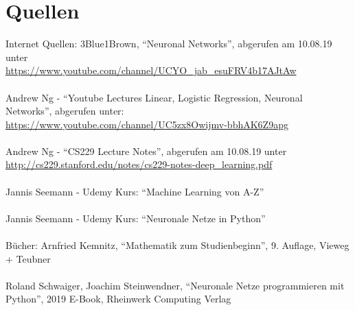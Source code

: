 \documentclass[a4paper]{scrreprt}
\begin{document}
\chapter{Quellen}
Internet Quellen:\newline
3Blue1Brown, ``Neuronal Networks'', abgerufen am 10.08.19 unter\\ \url{https://www.youtube.com/channel/UCYO_jab_esuFRV4b17AJtAw}
\\\\
Andrew Ng - ``Youtube Lectures Linear, Logistic Regression, Neuronal Networks'', abgerufen unter:\\ \url{https://www.youtube.com/channel/UC5zx8Owijmv-bbhAK6Z9apg}
\\\\
Andrew Ng - ``CS229 Lecture Notes'', abgerufen am 10.08.19 unter\\ \url{http://cs229.stanford.edu/notes/cs229-notes-deep_learning.pdf}
\\\\
Jannis Seemann - Udemy Kurs: ``Machine Learning von A-Z''
\\\\
Jannis Seemann - Udemy Kurs: ``Neuronale Netze in Python''
\\\\
Bücher:\newline
Arnfried Kemnitz, ``Mathematik zum Studienbeginn'', 9. Auflage, Vieweg + Teubner
\\\\
Roland Schwaiger, Joachim Steinwendner, ``Neuronale Netze programmieren mit Python'', 2019 E-Book, Rheinwerk Computing Verlag
\end{document}
